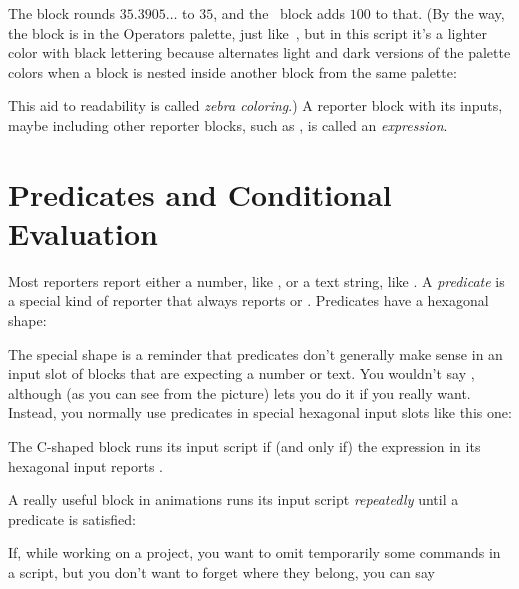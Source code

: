\documentclass{report}
\begin{document}
The  block rounds $35.3905\ldots$ to $35$, and the \code{+}~block adds $100$ to that. (By the way, the  block is in the Operators palette, just like~\code{+}, but in this script it's a lighter color with black lettering because \Snap{} alternates light and dark versions of the palette colors when a block is nested inside another block from the same palette:\nopagebreak


This aid to readability is called \emph{zebra coloring}.) A reporter block with its inputs, maybe including other reporter blocks, such as , is called an \emph{expression}.

\section{Predicates and Conditional Evaluation}

Most reporters report either a number, like , or a text string, like . A \emph{predicate} is a special kind of reporter that always reports  or . Predicates have a hexagonal shape:\nopagebreak


The special shape is a reminder that predicates don't generally make sense in an input slot of blocks that are expecting a number or text. You wouldn't say , although (as you can see from the picture) \Snap{} lets you do it if you really want. Instead, you normally use predicates in special hexagonal input slots like this one:\nopagebreak


The C-shaped  block runs its input script if (and only if) the expression in its hexagonal input reports .\nopagebreak


A really useful block in animations runs its input script \emph{repeatedly} until a predicate is satisfied:\nopagebreak


If, while working on a project, you want to omit temporarily some commands in a script, but you don't want to forget where they belong, you can say\nopagebreak

\end{document}
